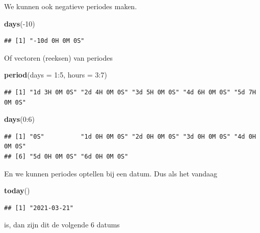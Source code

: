 \documentclass[]{tufte-book}
\newenvironment{Shaded}{}{}
\newcommand{\DataTypeTok}[1]{\textcolor[rgb]{0.56,0.13,0.00}{#1}}
\newcommand{\DecValTok}[1]{\textcolor[rgb]{0.25,0.63,0.44}{#1}}
\newcommand{\KeywordTok}[1]{\textcolor[rgb]{0.00,0.44,0.13}{\textbf{#1}}}
\newcommand{\NormalTok}[1]{#1}
\newcommand{\OperatorTok}[1]{\textcolor[rgb]{0.40,0.40,0.40}{#1}}
\begin{document}
We kunnen ook negatieve periodes maken.

\begin{Shaded}
\begin{Highlighting}[]
\KeywordTok{days}\NormalTok{(}\OperatorTok{-}\DecValTok{10}\NormalTok{)}
\end{Highlighting}
\end{Shaded}

\begin{verbatim}
## [1] "-10d 0H 0M 0S"
\end{verbatim}

Of vectoren (reeksen) van periodes

\begin{Shaded}
\begin{Highlighting}[]
\KeywordTok{period}\NormalTok{(}\DataTypeTok{days =} \DecValTok{1}\OperatorTok{:}\DecValTok{5}\NormalTok{, }\DataTypeTok{hours =} \DecValTok{3}\OperatorTok{:}\DecValTok{7}\NormalTok{)}
\end{Highlighting}
\end{Shaded}

\begin{verbatim}
## [1] "1d 3H 0M 0S" "2d 4H 0M 0S" "3d 5H 0M 0S" "4d 6H 0M 0S" "5d 7H 0M 0S"
\end{verbatim}

\begin{Shaded}
\begin{Highlighting}[]
\KeywordTok{days}\NormalTok{(}\DecValTok{0}\OperatorTok{:}\DecValTok{6}\NormalTok{)}
\end{Highlighting}
\end{Shaded}

\begin{verbatim}
## [1] "0S"          "1d 0H 0M 0S" "2d 0H 0M 0S" "3d 0H 0M 0S" "4d 0H 0M 0S"
## [6] "5d 0H 0M 0S" "6d 0H 0M 0S"
\end{verbatim}

En we kunnen periodes optellen bij een datum. Dus als het vandaag

\begin{Shaded}
\begin{Highlighting}[]
\KeywordTok{today}\NormalTok{()}
\end{Highlighting}
\end{Shaded}

\begin{verbatim}
## [1] "2021-03-21"
\end{verbatim}

is, dan zijn dit de volgende 6 datums
\end{document}
